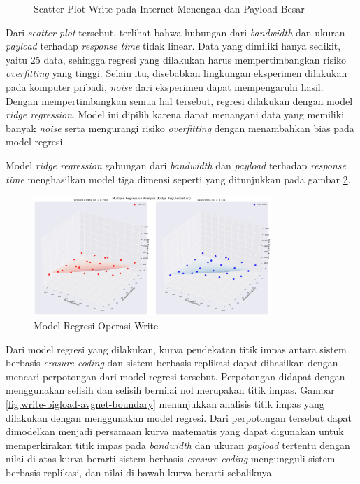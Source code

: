 \begin{enumerate}
\begin{figure}[ht]
    \caption{Scatter Plot Write pada Internet Menengah dan Payload Besar}
    \label{fig:write-bigload-avgnet-scatter}
  \end{figure}

  Dari \textit{scatter plot} tersebut, terlihat bahwa hubungan dari \textit{bandwidth} dan ukuran \textit{payload} terhadap \textit{response time} tidak linear. Data yang dimiliki hanya sedikit, yaitu 25 data, sehingga regresi yang dilakukan harus mempertimbangkan risiko \textit{overfitting} yang tinggi. Selain itu, disebabkan lingkungan eksperimen dilakukan pada komputer pribadi, \textit{noise} dari eksperimen dapat mempengaruhi hasil. Dengan mempertimbangkan semua hal tersebut, regresi dilakukan dengan model \textit{ridge regression}. Model ini dipilih karena dapat menangani data yang memiliki banyak \textit{noise} serta mengurangi risiko \textit{overfitting} dengan menambahkan bias pada model regresi.

  Model \textit{ridge regression} gabungan dari \textit{bandwidth} dan \textit{payload} terhadap \textit{response time} menghasilkan model tiga dimensi seperti yang ditunjukkan pada gambar \ref{fig:write-bigload-avgnet-regression}.

  \begin{figure}[ht]
    \centering
    \includegraphics[width=0.8\textwidth]{resources/chapter-4/write_bigload_avgnet_regression.png}

    \caption{Model Regresi Operasi Write}
    \label{fig:write-bigload-avgnet-regression}
  \end{figure}

  Dari model regresi yang dilakukan, kurva pendekatan titik impas antara sistem berbasis \textit{erasure coding} dan sistem berbasis replikasi dapat dihasilkan dengan mencari perpotongan dari model regresi tersebut. Perpotongan didapat dengan menggunakan selisih dan selisih bernilai nol merupakan titik impas. Gambar \ref{fig:write-bigload-avgnet-boundary} menunjukkan analisis titik impas yang dilakukan dengan menggunakan model regresi. Dari perpotongan tersebut dapat dimodelkan menjadi persamaan kurva matematis yang dapat digunakan untuk memperkirakan titik impas pada \textit{bandwidth} dan ukuran \textit{payload} tertentu dengan nilai di atas kurva berarti sistem berbasis \textit{erasure coding} mengungguli sistem berbasis replikasi, dan nilai di bawah kurva berarti sebaliknya.



\end{enumerate}
